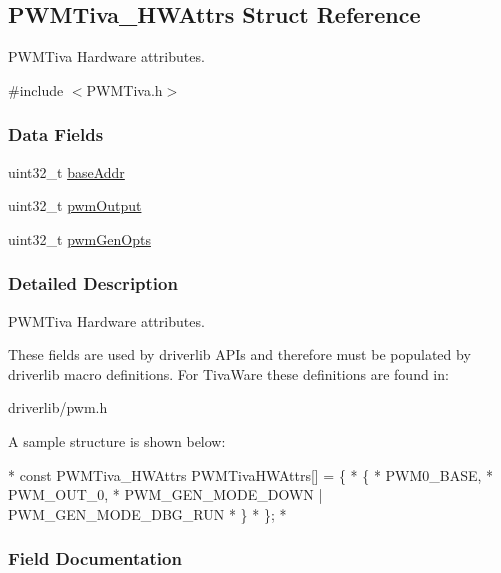 \subsection{P\-W\-M\-Tiva\-\_\-\-H\-W\-Attrs Struct Reference}
\label{struct_p_w_m_tiva___h_w_attrs}


P\-W\-M\-Tiva Hardware attributes.  




{\ttfamily \#include $<$P\-W\-M\-Tiva.\-h$>$}

\subsubsection*{Data Fields}
\begin{DoxyCompactItemize}
\item 
uint32\-\_\-t \hyperlink{struct_p_w_m_tiva___h_w_attrs_a12270fd5eca318763aab674472954692}{base\-Addr}
\item 
uint32\-\_\-t \hyperlink{struct_p_w_m_tiva___h_w_attrs_a125b0d4868fff9b2e30624fbbdc67df9}{pwm\-Output}
\item 
uint32\-\_\-t \hyperlink{struct_p_w_m_tiva___h_w_attrs_a000c25643c0e7aff1422a6a7b812193f}{pwm\-Gen\-Opts}
\end{DoxyCompactItemize}


\subsubsection{Detailed Description}
P\-W\-M\-Tiva Hardware attributes. 

These fields are used by driverlib A\-P\-Is and therefore must be populated by driverlib macro definitions. For Tiva\-Ware these definitions are found in\-:
\begin{DoxyItemize}
\item driverlib/pwm.\-h
\end{DoxyItemize}

A sample structure is shown below\-: 
\begin{DoxyCode}
*  \textcolor{keyword}{const} PWMTiva_HWAttrs PWMTivaHWAttrs[] = \{
*      \{
*          PWM0\_BASE,
*          PWM\_OUT\_0,
*          PWM\_GEN\_MODE\_DOWN | PWM\_GEN\_MODE\_DBG\_RUN
*      \}
*  \};
*  
\end{DoxyCode}
 

\subsubsection{Field Documentation}
